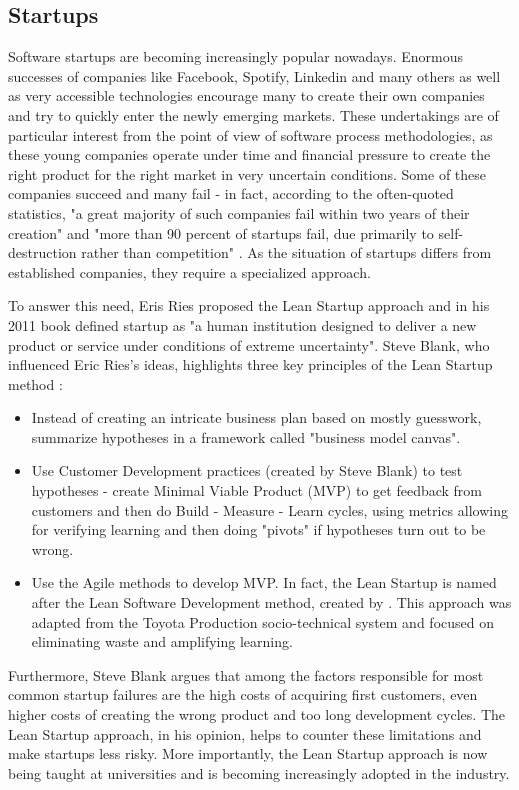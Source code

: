 \documentclass{article}
\begin{document}
\subsection{Startups}
Software startups are becoming increasingly popular nowadays. Enormous successes of companies like Facebook, Spotify, Linkedin and many others as well as very accessible technologies encourage many to create their own companies and try to quickly enter the newly emerging markets. These undertakings are of particular interest from the point of view of software process methodologies, as these young companies operate under time and financial pressure to create the right product for the right market in very uncertain conditions. Some of these companies succeed and many fail - in fact, according to the often-quoted statistics, "a great majority of such companies fail within two years of their creation" \citep{paternoster2014software} and "more than 90 percent of startups fail, due primarily to self-destruction rather than competition" \citep{giardino2014early}. As the situation of startups differs from established companies, they require a specialized approach. 

To answer this need, Eris Ries proposed the Lean Startup approach and in his 2011 book defined startup as "a human institution designed to deliver a new product or service under conditions of extreme uncertainty"\citep{ries2011lean}. Steve Blank, who influenced Eric Ries's ideas, highlights three key principles of the Lean Startup method \citep{blank2013lean}:
\begin{itemize}
  \item Instead of creating an intricate business plan based on mostly guesswork, summarize hypotheses in a framework called "business model canvas".
  \item Use Customer Development practices (created by Steve Blank) to test hypotheses - create Minimal Viable Product (MVP) to get feedback from customers and then do Build - Measure - Learn cycles, using metrics allowing for verifying learning and then doing "pivots" if hypotheses turn out to be wrong.
  \item Use the Agile methods to develop MVP. In fact, the Lean Startup is named after the Lean Software Development method, created by \cite{poppendieck2003lean}. This approach was adapted from the Toyota Production socio-technical system and focused on eliminating waste and amplifying learning.
\end{itemize}

Furthermore, Steve Blank argues that among the factors responsible for most common startup failures are the high costs of acquiring first customers, even higher costs of creating the wrong product and too long development cycles. The Lean Startup approach, in his opinion, helps to counter these limitations and make startups less risky. More importantly, the Lean Startup approach is now being taught at universities and is becoming increasingly adopted in the industry.
\end{document}
